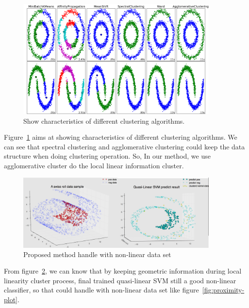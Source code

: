 \documentclass[master]{IPSstyle}
\begin{document}
{\begin{figure}[H]
    \centering
    \includegraphics[width=0.9\textwidth]{figures/ch3_compare_cluster.png}
    \caption{Show characteristics of different clustering algorithms. }
    \label{fig:cluster_comparision}
\end{figure}
Figure~\ref{fig:cluster_comparision} aims at showing characteristics of different clustering algorithms. We can see that spectral clustering and agglomerative clustering could keep the data structure when doing clustering operation. So, In our method, we use agglomerative cluster do the local linear information cluster.

\begin{figure}[H]
    \centering
    \includegraphics[width=0.9\textwidth]{figures/ch3_cluster_linear_info.png}
    \caption{Proposed method handle with non-linear data set}
    \label{fig:cluster_linear_info}
\end{figure}
From figure~\ref{fig:cluster_linear_info}, we can know that by keeping geometric information during local linearity cluster process, final trained quasi-linear SVM still a good non-linear classifier, so that could handle with non-linear data set like figure~\ref{fig:proximity-plot}.

}
\end{document}
